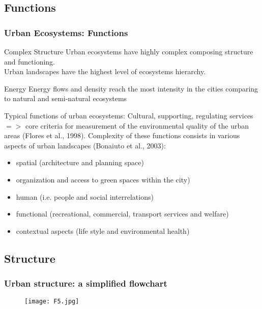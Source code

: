 \documentclass[pdflatex,compress,8pt,
	xcolor={dvipsnames,dvipsnames,svgnames,x11names,table},
	hyperref={colorlinks = true,breaklinks = true, urlcolor = NavyBlue, breaklinks = true}]{beamer}
\begin{document}
\subsection{Functions}
\begin{frame}\frametitle{Urban Ecosystems: Functions}

\begin{alertblock}{Complex Structure}
Urban ecosystems have highly complex composing structure and functioning. \\
Urban landscapes have the highest level of ecosystems hierarchy.
\end{alertblock}

\begin{block}{Energy}
Energy flows and density reach the most intensity in the cities comparing to natural and semi-natural ecosystems
\end{block}

\begin{examples}{Typical functions of urban ecosystems:}
Cultural, supporting, regulating services $=>$ core criteria for measurement of the environmental quality of the urban areas (Flores et al., 1998). Complexity of these functions consists in various aspects of urban landscapes (Bonaiuto et al., 2003): 
\begin{itemize}
	\item spatial (architecture and planning space)
	\item organization and access to green spaces within the city)
	\item human (i.e. people and social interrelations)
	\item functional (recreational, commercial, transport services and welfare)
	\item contextual aspects (life style and environmental health)
\end{itemize}
\end{examples}
\end{frame}

\subsection{Structure}
\begin{frame}\frametitle{Urban structure: a simplified flowchart}
\begin{figure}[H]
	\centering
		\texttt{[image: F5.jpg]}
\end{figure}
\end{frame}
\end{document}
